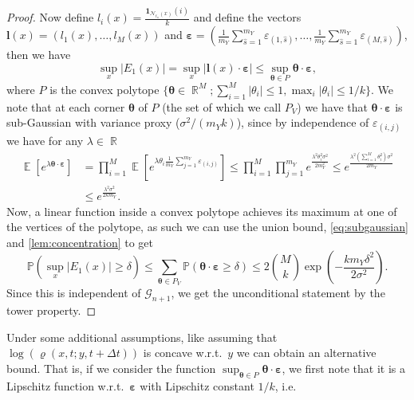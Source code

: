 \documentclass[11pt,reqno,a4paper]{amsart}
\theoremstyle{definition}
\numberwithin{equation}{section}
\renewcommand{\P}{\mathbb{P}}
\DeclareMathOperator{\E}{\mathbb{E}}
\DeclareMathOperator{\R}{\mathbb{R}}
\DeclareMathOperator{\1}{\mathbbm{1}}
\begin{document}
\begin{proof}
  Now define $l_i(x) = \frac{\mathbf{1}_{\mathcal{N}_{t_n}(x)}(i)}{k}$ and define the vectors $\mathbf{l}(x) = (l_1(x),\allowbreak\ldots,\allowbreak l_M(x))$ and $\bm{\varepsilon} = (\frac{1}{m_Y}\sum_{\hat s=1}^{m_Y}\varepsilon_{(1,\hat s)},\allowbreak\ldots,\allowbreak\frac{1}{m_Y}\sum_{\hat s=1}^{m_Y}\varepsilon_{(M,\hat s)})$, then we have
  \begin{equation*}
    \sup_x |E_1(x)| = \sup_x |\mathbf{l}(x) \cdot \bm{\varepsilon}| \leq \sup_{\bm{\theta} \in P} \bm{\theta} \cdot \bm{\varepsilon},
  \end{equation*}
  where $P$ is the convex polytope $\{ \bm{\theta} \in \R^M ; \sum_{i=1}^M |\theta_i| \leq 1 , \max_i |\theta_i| \leq 1/k\}$. We note that at each corner $\bm{\theta}$ of $P$ (the set of which we call $P_V$) we have that $\bm{\theta} \cdot \bm{\varepsilon}$ is sub-Gaussian with variance proxy ($\sigma^2/(m_Y k)$), since by independence of $\varepsilon_{(i,j)}$ we have for any $\lambda \in \R$
  \begin{equation} \label{eq:subgaussian}
    \begin{split}
      \E[e^{\lambda \bm{\theta} \cdot \bm{\varepsilon}}]
       & =
      \prod_{i=1}^M \E[e^{\lambda \theta_i \frac{1}{m_Y} \sum_{j=1}^{m_Y} \varepsilon_{(i,j)}}]
      \leq
      \prod_{i=1}^M \prod_{j=1}^{m_Y} e^{\frac{\lambda^2 \theta_i^2 \sigma^2}{2 m_Y^2}} \leq e^{\frac{\lambda^2 (\sum_{i=1}^M \theta_i^2) \sigma^2}{2 m_Y}}
      \\
       & \leq e^{\frac{\lambda^2 \sigma^2}{2 k m_Y}}.
    \end{split}
  \end{equation}
  Now, a linear function inside a convex polytope achieves its maximum at one of the vertices of the polytope, as such we can use the union bound, \cref{eq:subgaussian} and \cref{lem:concentration} to get
  \begin{equation*}
    \P(\sup_x |E_1(x)| \geq \delta) \leq \sum_{\bm{\theta} \in P_V} \P(\bm{\theta} \cdot \bm{\varepsilon} \geq \delta) \leq
    2{\binom{M}{k}} \exp \left (-\frac{k m_Y \delta^2}{2 \sigma^2} \right ).
  \end{equation*}
  Since this is independent of $\mathcal{G}_{n+1}$, we get the unconditional statement by the tower property.
\end{proof}
Under some additional assumptions, like assuming that $\log(\varrho(x,t;y,t+\Delta t))$ is concave w.r.t.~$y$ we can obtain an alternative bound. That is, if we consider the function $\sup_{\bm{\theta} \in P} \bm{\theta} \cdot \bm{\varepsilon}$, we first note that it is a Lipschitz function w.r.t.~$\bm{\varepsilon}$ with Lipschitz constant $1/k$, i.e.
\end{document}

